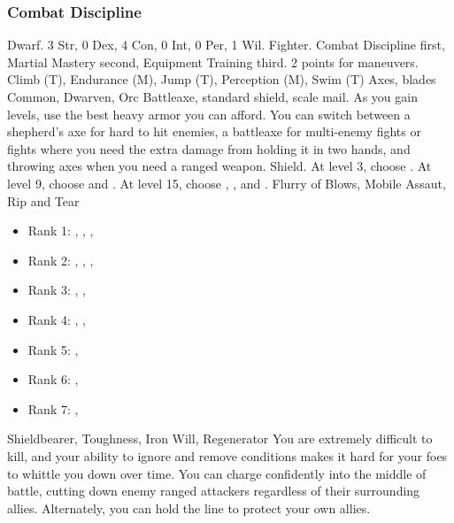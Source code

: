         \subsubsection{Combat Discipline}
             Dwarf.
             3 Str, 0 Dex, 4 Con, 0 Int, 0 Per, 1 Wil.
             Fighter.
             Combat Discipline first, Martial Mastery second, Equipment Training third.
             2 points for maneuvers.
             Climb (T), Endurance (M), Jump (T), Perception (M), Swim (T)
             Axes, blades
             Common, Dwarven, Orc
             Battleaxe, standard shield, scale mail. As you gain levels, use the best heavy armor you can afford.
            You can switch between a shepherd's axe for hard to hit enemies, a battleaxe for multi-enemy fights or fights where you need the extra damage from holding it in two hands, and throwing axes when you need a ranged weapon.
             Shield.
                At level 3, choose .
                At level 9, choose  and .
                At level 15, choose , , and .
             Flurry of Blows, Mobile Assaut, Rip and Tear
            \begin{itemize}
                \item Rank 1: , , , 
                \item Rank 2: , , , 
                \item Rank 3: , , 
                \item Rank 4: , , 
                \item Rank 5: , 
                \item Rank 6: , 
                \item Rank 7: , 
            \end{itemize}
             Shieldbearer, Toughness, Iron Will, Regenerator
             You are extremely difficult to kill, and your ability to ignore and remove conditions makes it hard for your foes to whittle you down over time.
            You can charge confidently into the middle of battle, cutting down enemy ranged attackers regardless of their surrounding allies.
            Alternately, you can hold the line to protect your own allies.

